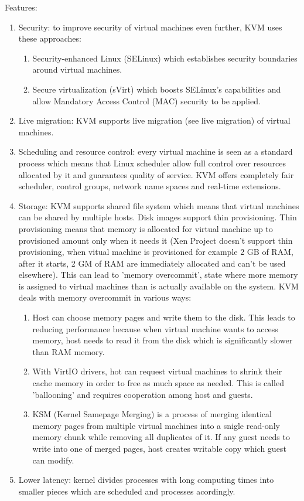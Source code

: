 \begin{enumerate}
Features:
\begin{enumerate}
\item Security: to improve security of virtual machines even further, KVM uses these approaches:
\begin{enumerate}
\item Security-enhanced Linux (SELinux) which establishes security boundaries around virtual machines.
\item Secure virtualization (sVirt) which boosts SELinux's capabilities and allow Mandatory Access Control (MAC) security to be applied.
\end{enumerate}
\item Live migration: KVM supports live migration (see live migration) of virtual machines.
\item Scheduling and resource control: every virtual machine is seen as a standard process which means that Linux scheduler allow full control over resources allocated by it and guarantees quality of service. KVM offers completely fair scheduler, control groups, network name spaces and real-time extensions.
\item Storage: KVM supports shared file system which means that virtual machines can be shared by multiple hosts. Disk images support thin provisioning. Thin provisioning means that memory is allocated for virtual machine up to provisioned amount only when it needs it (Xen Project doesn't support thin provisioning, when vitual machine is provisioned for example 2 GB of RAM, after it starts, 2 GM of RAM are immediately allocated and can't be used elsewhere). This can lead to 'memory overcommit', state where more memory is assigned to virtual machines than is actually available on the system. KVM deals with memory overcommit in various ways:
\begin{enumerate}
\item Host can choose memory pages and write them to the disk. This leads to reducing performance because when virtual machine wants to access memory, host needs to read it from the disk which is significantly slower than RAM memory.
\item With VirtIO drivers, hot can request virtual machines to shrink their cache memory in order to free as much space as needed. This is called 'ballooning' and requires cooperation among host and guests.
\item KSM (Kernel Samepage Merging) is a process of merging identical memory pages from multiple virtual machines into a snigle read-only memory chunk while removing all duplicates of it. If any guest needs to write into one of merged pages, host creates writable copy which guest can modify.
\end{enumerate}
\item Lower latency: kernel divides processes with long computing times into smaller pieces which are scheduled and processes acordingly.
\end{enumerate}



\end{enumerate}
